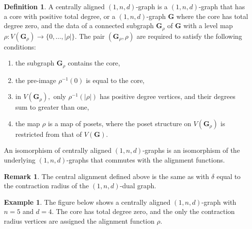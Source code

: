 \documentclass[12pt,reqno]{amsart}
\theoremstyle{definition}
\theoremstyle{definition}
\theoremstyle{definition}
\theoremstyle{definition}
\newtheorem{remark}[theorem]{Remark}
\newtheorem{definition}[theorem]{Definition}
\newtheorem{example}[theorem]{Example}
\begin{document}
\begin{definition}\label{defn:centrgrph}
  A centrally aligned $(1,n,d)$-graph is a $(1,n,d)$-graph that has a core with positive total degree, or a $(1,n,d)$-graph $\mathbf{G}$ where the core has total degree zero, and the data of a connected subgraph $\mathbf{G}_\rho$ of $\mathbf{G}$ with a level map $\rho: V(\mathbf{G}_\rho)\to \{0,\dots, |\rho|\}$. The pair $(\mathbf{G}_\rho, \rho)$ are required to satisfy the following conditions:
\begin{enumerate}
  \item the subgraph $\mathbf{G}_\rho$ contains the core,
  \item the pre-image $\rho^{-1}(0)$ is equal to the core,
  \item in $V(\mathbf{G}_\rho),$ only $\rho^{-1}(|\rho|)$ has positive degree vertices, and their degrees sum to greater than one,
  \item the map $\rho$ is a map of posets, where the poset structure on $V(\mathbf{G}_\rho)$ is restricted from that of $V(\mathbf{G}).$
\end{enumerate}
  
  An isomorphism of centrally aligned $(1,n,d)$-graphs is an isomorphism of the underlying $(1,n,d)$-graphs that commutes with the alignment functions.
\end{definition}

\begin{remark}
  The central alignment defined above is the same as \cite[§4.6]{rspw} with $\delta$ equal to the contraction radius of the $(1,n,d)$-dual graph.
\end{remark}

\begin{example}
  The figure below shows a centrally aligned $(1,n,d)$-graph with $n=5$ and $d=4.$ The core has total degree zero, and the only the contraction radius vertices are assigned the alignment function $\rho$.
\end{example}
\end{document}
